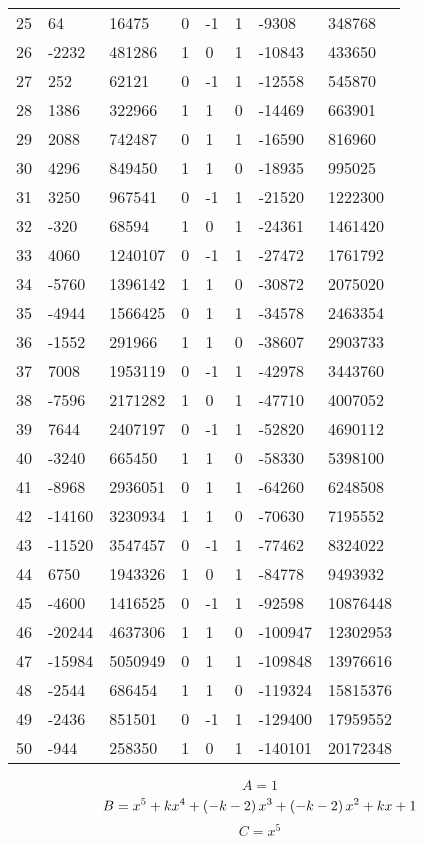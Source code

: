 \documentclass{amsart}
\begin{document}
\begin{longtable}{|l|l|l|lllll|}
25&64&16475&0&-1&1&-9308&348768\\
26&-2232&481286&1&0&1&-10843&433650\\
27&252&62121&0&-1&1&-12558&545870\\
28&1386&322966&1&1&0&-14469&663901\\
29&2088&742487&0&1&1&-16590&816960\\
30&4296&849450&1&1&0&-18935&995025\\
31&3250&967541&0&-1&1&-21520&1222300\\
32&-320&68594&1&0&1&-24361&1461420\\
33&4060&1240107&0&-1&1&-27472&1761792\\
34&-5760&1396142&1&1&0&-30872&2075020\\
35&-4944&1566425&0&1&1&-34578&2463354\\
36&-1552&291966&1&1&0&-38607&2903733\\
37&7008&1953119&0&-1&1&-42978&3443760\\
38&-7596&2171282&1&0&1&-47710&4007052\\
39&7644&2407197&0&-1&1&-52820&4690112\\
40&-3240&665450&1&1&0&-58330&5398100\\
41&-8968&2936051&0&1&1&-64260&6248508\\
42&-14160&3230934&1&1&0&-70630&7195552\\
43&-11520&3547457&0&-1&1&-77462&8324022\\
44&6750&1943326&1&0&1&-84778&9493932\\
45&-4600&1416525&0&-1&1&-92598&10876448\\
46&-20244&4637306&1&1&0&-100947&12302953\\
47&-15984&5050949&0&1&1&-109848&13976616\\
48&-2544&686454&1&1&0&-119324&15815376\\
49&-2436&851501&0&-1&1&-129400&17959552\\
50&-944&258350&1&0&1&-140101&20172348\\
\hline
\end{longtable}
$$A=1$$
$$B=x^5
 + k\*x^4
 + \left(-k
 - 2\right) \*x^3
 + \left(-k
 - 2\right) \*x^2
 + k\*x
 + 1$$
$$C=x^5$$
\end{document}
